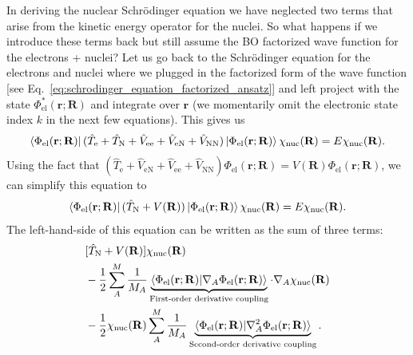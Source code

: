 \documentclass[../Main/chem532-notes.tex]{subfiles}
\begin{document}
\begin{details}	
In deriving the nuclear Schr\"{o}dinger equation we have neglected two terms that arise from the kinetic energy operator for the nuclei. So what happens if we introduce these terms back but still assume the BO factorized wave function for the electrons + nuclei?
Let us go back to the Schr\"{o}dinger equation for the electrons and nuclei where we plugged in the factorized form of the wave function [see Eq.~\eqref{eq:schrodinger_equation_factorized_ansatz}] and left project with the state $\Phi_{\mathrm{el}}^*(\mathbf{r};\mathbf{R})$ and integrate over $\mathbf{r}$ (we momentarily omit the electronic state index $k$ in the next few equations). This gives us
\begin{equation}
\begin{split}
\bra{\Phi_{\mathrm{el}}(\mathbf{r};\mathbf{R})} (\hat{T}_\mathrm{e} + \hat{T}_\mathrm{N}   + \hat{V}_\mathrm{ee} + \hat{V}_\mathrm{eN} +\hat{V}_\mathrm{NN} ) \ket{\Phi_{\mathrm{el}}(\mathbf{r};\mathbf{R})}  \chi_{\mathrm{nuc}}(\mathbf{R})
= E \chi_{\mathrm{nuc}}(\mathbf{R}).
\end{split}
\end{equation}
Using the fact that $(\hat{T}_\mathrm{e} + \hat{V}_\mathrm{eN} + \hat{V}_\mathrm{ee} + \hat{V}_\mathrm{NN} ) \Phi_{\mathrm{el}}(\mathbf{r};\mathbf{R}) = V(\mathbf{R}) \Phi_{\mathrm{el}}(\mathbf{r};\mathbf{R})$, we can simplify this equation to
\begin{equation}
\label{eq:molecular_hamiltonian:diagonal_bo}
\begin{split}
\bra{\Phi_{\mathrm{el}}(\mathbf{r};\mathbf{R})} (\hat{T}_\mathrm{N} +V(\mathbf{R}) ) \ket{\Phi_{\mathrm{el}}(\mathbf{r};\mathbf{R})}  \chi_{\mathrm{nuc}}(\mathbf{R})
= E \chi_{\mathrm{nuc}}(\mathbf{R}).
\end{split}
\end{equation}
The left-hand-side of this equation can be written as the sum of three terms:
\begin{equation}
\begin{split}
& [\hat{T}_\mathrm{N} +V(\mathbf{R})]  \chi_{\mathrm{nuc}}(\mathbf{R})  \\
& 
-\frac{1}{2} \sum_A^M \frac{1}{M_A}
\underbrace{\braket{\Phi_{\mathrm{el}}(\mathbf{r};\mathbf{R})|\nabla_A \Phi_{\mathrm{el}}(\mathbf{r};\mathbf{R})}}_{\text{First-order derivative coupling}}  \cdot \nabla_A \chi_{\mathrm{nuc}}(\mathbf{R}) \\
& 
-\frac{1}{2} \chi_{\mathrm{nuc}}(\mathbf{R}) \sum_A^M \frac{1}{M_A} \underbrace{\braket{\Phi_{\mathrm{el}}(\mathbf{r};\mathbf{R}) |\nabla^2_A \Phi_{\mathrm{el}}(\mathbf{r};\mathbf{R})} }_{\text{Second-order derivative coupling}}  .

\end{split}
\end{equation}
\end{details}
\end{document}
